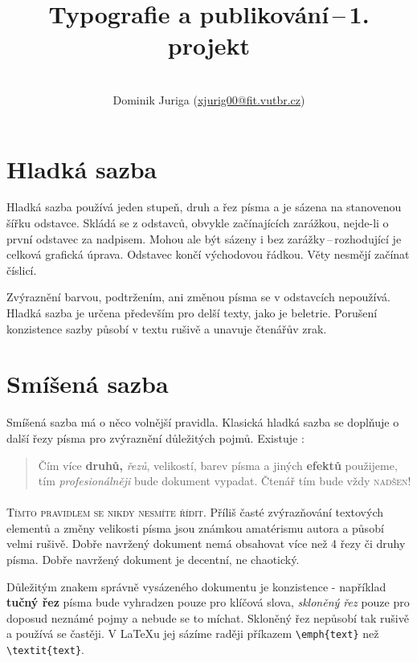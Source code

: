 \documentclass[hidelinks,10pt,a4paper,twocolumn]{article}
\date{}
\title{Typografie a publikování\,--\,1. projekt}
\author{\\ Dominik Juriga (\href{mailto:xjurig00@stud.fit.vutbr.cz}{{\fontfamily{lmtt}\selectfont xjurig00@fit.vutbr.cz}})}
\begin{document}
	
	\maketitle
	

	\section{Hladká sazba}
	Hladká sazba používá jeden stupeň, druh a řez písma \linebreak a je sázena na stanovenou šířku odstavce. Skládá se z odstavců, obvykle začínajících zarážkou, nejde-li o první odstavec za nadpisem. Mohou ale být sázeny i bez zarážky\,--\,rozhodující je celková grafická úprava. Odstavec končí východovou řádkou. Věty nesmějí začínat číslicí.
	
	Zvýraznění barvou, podtržením, ani změnou písma se v odstavcích nepoužívá. Hladká sazba je určena především pro delší texty, jako je beletrie. Porušení konzistence sazby působí v textu rušivě a unavuje čtenářův zrak.
	
	\section{Smíšená sazba}
	\label{sec:smisena}
	
Smíšená sazba má o něco volnější pravidla. Klasická hladká sazba se doplňuje o další řezy písma pro zvýraznění důležitých pojmů. Existuje :
	
	
\begin{quotation}
	\noindent Čím více \textbf{druhů,} \emph{řezů}, \footnotesize velikostí\normalsize, barev písma {\sffamily\selectfont a jiných} \tiny \textbf{efektů}  \normalsize použijeme, tím \emph{profesionálněji }bude dokument vypadat. Čtenář tím \large bude \Large vždy \Huge \textsc{nadšen}!
	\normalsize	

\end{quotation}

	\paragraph{}\textsc{Tímto pravidlem se nikdy nesmíte řídit}. Příliš časté zvýrazňování textových elementů a změny velikosti písma jsou známkou amatérismu autora a působí velmi rušivě. Dobře navržený dokument nemá obsahovat více než
	4 řezy či druhy písma. Dobře navržený dokument je decentní, ne chaotický.
	
	Důležitým znakem správně vysázeného dokumentu je konzistence - například \textbf{tučný řez} písma bude vyhradzen pouze pro klíčová slova, \emph{skloněný řez} pouze pro doposud neznámé pojmy a nebude se to míchat. Skloněný řez nepůsobí tak rušivě a používá se častěji. V \LaTeX u jej sázíme raději příkazem \verb|\emph{text}| než \verb|\textit{text}|.
	
\end{document}
